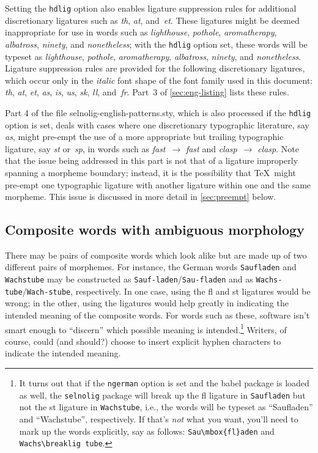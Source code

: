 \documentclass[11pt]{article}
\newcommand{\pkg}[1]{\textsf{#1}}
\newcommand{\opt}[1]{\texttt{#1}}
\begin{document}
Setting the \opt{hdlig} option also enables ligature suppression rules for additional discretionary ligatures such as \emph{th}, \emph{at}, and~\emph{et}. These ligatures might be deemed inappropriate for use in words such as \emph{ligh\mbox{th}ouse}, \emph{po\mbox{th}ole}, \emph{arom\mbox{at}herapy}, \emph{alb\mbox{at}ross}, \emph{nin\mbox{et}y}, and \emph{non\mbox{et}heless}; with the \opt{hdlig} option set, these words will be typeset as \emph{lighthouse}, \emph{pothole}, \emph{aromatherapy}, \emph{albatross}, \emph{ninety}, and \emph{nonetheless}. Ligature suppression rules are provided for the following discretionary ligatures, which occur only in the \emph{italic} font shape of the font family used in this document: \emph{th}, \emph{at}, \emph{et}, \emph{as}, \emph{is}, \emph{us}, {\ebg \emph{sk}}, \emph{ll}, and~\emph{fr}. Part~3 of \cref{sec:eng-listing} lists these rules.

Part 4 of the file \pkg{selnolig-english-patterns.sty}, which is also processed if the \opt{hdlig} option is set, deals with cases where one discretionary typographic literature, say \emph{as}, might pre-empt the use of a more appropriate but trailing typographic ligature, say \emph{st} or~\emph{sp}, in words such as \emph{f\mbox{as}t}~$\to$ \emph{fa\mbox{st}} and \emph{cl\mbox{as}p}~$\to$ \emph{cla\mbox{sp}}. Note that the issue being addressed in this part is not that of a ligature improperly spanning a morpheme boundary; instead, it is the possibility that \TeX\ might pre-empt one typographic ligature with another ligature within one and the same morpheme. This issue is discussed in more detail in \cref{sec:preempt} below.

\subsection{Composite words with ambiguous morphology}

There may be pairs of composite words which look alike but are made up of two different pairs of morphemes. For instance, the German words \opt{Saufladen} and \opt{Wachstube} may be constructed as \opt{Sauf-laden}\slash \opt{Sau-fladen} and as \opt{Wachs-tube}\slash \opt{Wach-stube}, respectively. In one case, using the fl and st ligatures would be wrong; in the other, using the ligatures would help greatly in indicating the intended meaning of the composite words. 
For words such as these, software isn't smart enough to \enquote{discern} which possible meaning is intended.\footnote{It turns out that if the \opt{ngerman} option is set and the \pkg{babel} package is loaded as well, the \opt{selnolig} package will break up the fl ligature in \opt{Saufladen} but not the st ligature in \opt{Wachstube}, i.e., the words will be typeset as \enquote{Saufladen} and \enquote{Wachstube}, respectively. If that's \emph{not} what you want, you'll need to mark up the words explicitly, say as follows: \Verb+Sau\mbox{fl}aden+ and \Verb+Wachs\breaklig tube+. } Writers, of course, could (and should?) choose to insert explicit hyphen characters to indicate the intended meaning.
\end{document}
